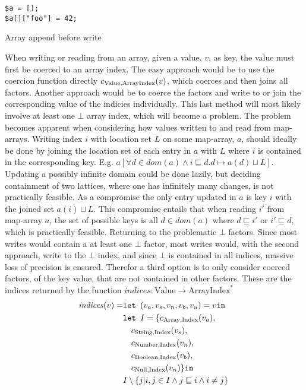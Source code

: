 \begin{program}
\centering
\begin{lstlisting}
$a = [];
$a[]["foo"] = 42;
\end{lstlisting}
\caption{Array append before write}
\label{lst:appendbefw}
\end{program}
When writing or reading from an array, given a value, $v$, as key, the value must first be coerced to an array index. The easy approach would be to use the coercion function directly $c_{\text{Value}, \text{ArrayIndex}}(v)$, which coerces and then joins all factors. Another approach would be to coerce the factors and write to or join the corresponding value of the indicies individually. This last method will most likely involve at least one $\bot$ array index, which will become a problem. The problem becomes apparent when considering how values written to and read from map-arrays. Writing index $i$ with location set $L$ on some map-array, $a$, should ideally be done by joining the location set of each entry in $a$ with $L$ where $i$ is contained in the corresponding key. E.g. $a[\forall d \in dom(a)\wedge i \sqsubseteq d. d \mapsto a(d)\sqcup L]$. Updating a possibly infinite domain could be done lazily, but deciding containment of two lattices, where one has infinitely many changes, is not practically feasible. As a compromise the only entry updated in $a$ is key $i$ with the joined set $a(i)\sqcup L$. This compromise entails that when reading $i'$ from map-array $a$, the set of possible keys is all $d\in dom(a)$ where $d\sqsubseteq i'$ or $i'\sqsubseteq d$, which is practically feasible. Returning to the problematic $\bot$ factors. Since most writes would contain a at least one $\bot$ factor, most writes would, with the second approach, write to the $\bot$ index, and since $\bot$ is contained in all indices, massive loss of precision is ensured. Therefor a third option is to only consider coerced factors, of the key value, that are not contained in other factors. These are the indices returned by the function $\mathit{indices}: \text{Value} \rightarrow \text{ArrayIndex}^*$
\newcommand{\is}{\texttt{ is }}
\begin{align}
    \mathit{indices}(v) =    &\texttt{let } (v_a,v_s, v_n, v_b, v_u) = v \texttt{in }\notag\\
                    & \texttt{let } I = \{ c_{\text{Array}, \text{Index}}(v_a),\notag\\
                    &\quad c_{\text{String}, \text{Index}}(v_s),\notag\\
                    &\quad c_{\text{Number}, \text{Index}}(v_n),\notag\\
                    &\quad c_{\text{Boolean}, \text{Index}}(v_b),\notag\\
                    &\quad c_{\text{Null}, \text{Index}}(v_n) \} \texttt{in }\notag\\
                    &I \setminus \{j|i,j\in I \wedge j\sqsubseteq i \wedge i \neq j \}
\end{align}
